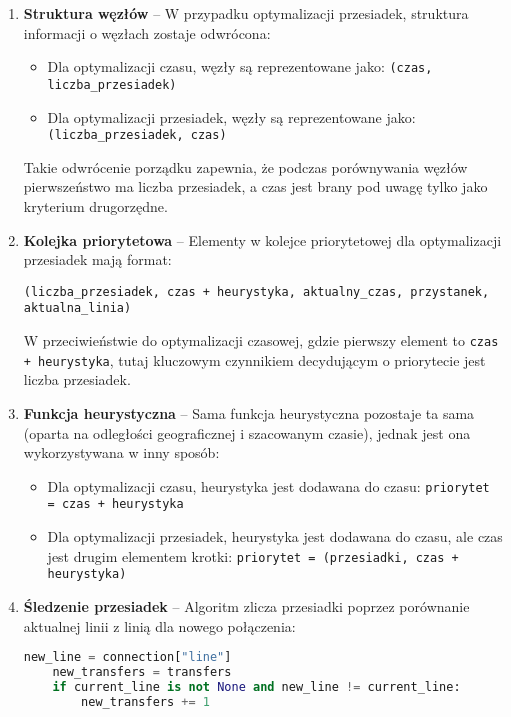 \documentclass[12pt,a4paper]{article}
\begin{document}
\begin{enumerate}
    \item \textbf{Struktura węzłów} -- W przypadku optymalizacji przesiadek, struktura informacji o węzłach zostaje odwrócona:
    \begin{itemize}
        \item Dla optymalizacji czasu, węzły są reprezentowane jako: \texttt{(czas, liczba\_przesiadek)}
        \item Dla optymalizacji przesiadek, węzły są reprezentowane jako: \texttt{(liczba\_przesiadek, czas)}
    \end{itemize}
    Takie odwrócenie porządku zapewnia, że podczas porównywania węzłów pierwszeństwo ma liczba przesiadek, a czas jest brany pod uwagę tylko jako kryterium drugorzędne.
    
    \item \textbf{Kolejka priorytetowa} -- Elementy w kolejce priorytetowej dla optymalizacji przesiadek mają format:
    \begin{center}
        \texttt{(liczba\_przesiadek, czas + heurystyka, aktualny\_czas, przystanek, aktualna\_linia)}
    \end{center}
    W przeciwieństwie do optymalizacji czasowej, gdzie pierwszy element to \texttt{czas + heurystyka}, tutaj kluczowym czynnikiem decydującym o priorytecie jest liczba przesiadek.
    
    \item \textbf{Funkcja heurystyczna} -- Sama funkcja heurystyczna pozostaje ta sama (oparta na odległości geograficznej i szacowanym czasie), jednak jest ona wykorzystywana w inny sposób:
    \begin{itemize}
        \item Dla optymalizacji czasu, heurystyka jest dodawana do czasu: \texttt{priorytet = czas + heurystyka}
        \item Dla optymalizacji przesiadek, heurystyka jest dodawana do czasu, ale czas jest drugim elementem krotki: \texttt{priorytet = (przesiadki, czas + heurystyka)}
    \end{itemize}
    
    \item \textbf{Śledzenie przesiadek} -- Algoritm zlicza przesiadki poprzez porównanie aktualnej linii z linią dla nowego połączenia:
    \begin{lstlisting}[language=Python]
    new_line = connection["line"]
    new_transfers = transfers
    if current_line is not None and new_line != current_line:
        new_transfers += 1
    \end{lstlisting}
    

\end{enumerate}
\end{document}

